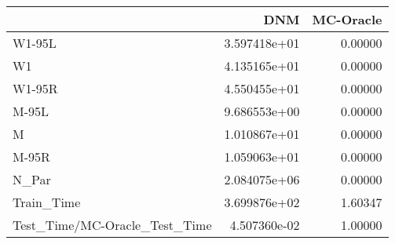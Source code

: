 \begin{tabular}{lrr}
\toprule
{} &           DNM &  MC-Oracle \\
\midrule
W1-95L                        &  3.597418e+01 &    0.00000 \\
W1                            &  4.135165e+01 &    0.00000 \\
W1-95R                        &  4.550455e+01 &    0.00000 \\
M-95L                         &  9.686553e+00 &    0.00000 \\
M                             &  1.010867e+01 &    0.00000 \\
M-95R                         &  1.059063e+01 &    0.00000 \\
N\_Par                         &  2.084075e+06 &    0.00000 \\
Train\_Time                    &  3.699876e+02 &    1.60347 \\
Test\_Time/MC-Oracle\_Test\_Time &  4.507360e-02 &    1.00000 \\
\bottomrule
\end{tabular}
